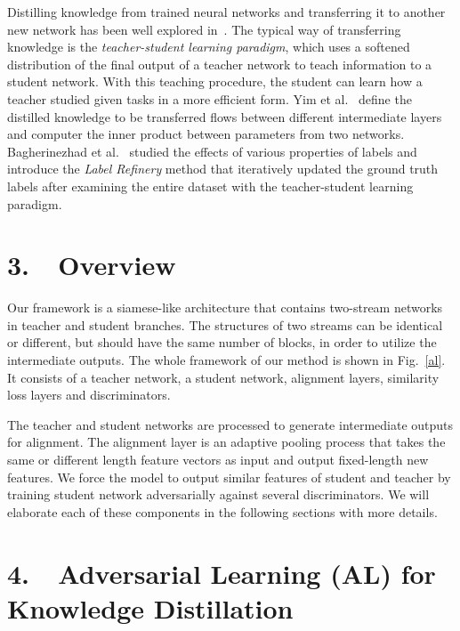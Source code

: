 \documentclass[letterpaper]{article} %
\begin{document}
Distilling knowledge from trained neural networks and transferring it to another new network has been well explored in~\cite{hinton2015distilling,chen2015net2net,li2017learning,yim2017gift,bagherinezhad2018label,anil2018large}. The typical way of transferring knowledge is the {\em {teacher-student learning paradigm}}, which uses a softened distribution of the final output of a teacher network to teach information to a student network. With this teaching procedure, the student can learn how a teacher studied given tasks in a more efficient form. Yim et al.~\cite{yim2017gift} define the distilled knowledge to be transferred flows between different intermediate layers and computer the inner product between parameters from two networks. Bagherinezhad et al.~\cite{bagherinezhad2018label} studied the effects of various properties of labels and introduce the {\em {Label Refinery}} method that iteratively updated the ground truth labels after examining the entire dataset with the {{teacher-student learning paradigm}}.

\section{3.~~Overview}
Our framework is a siamese-like architecture that contains two-stream networks in teacher and student branches. The structures of two streams can be identical or different, but should have the same number of blocks, in order to utilize the intermediate outputs. 
The whole framework of our method is shown in Fig.~\ref{al}. It consists of a teacher network, a student network, alignment layers, similarity loss layers and discriminators.

The teacher and student networks are processed to generate intermediate outputs for alignment. The alignment layer is an adaptive pooling process that takes the same or different length feature vectors as input and output fixed-length new features. We force the model to output similar features of student and teacher by training student network adversarially against several discriminators.
We will elaborate each of these components in the following sections with more details.
\section{4.~~Adversarial Learning (AL) for Knowledge Distillation}
\end{document}
